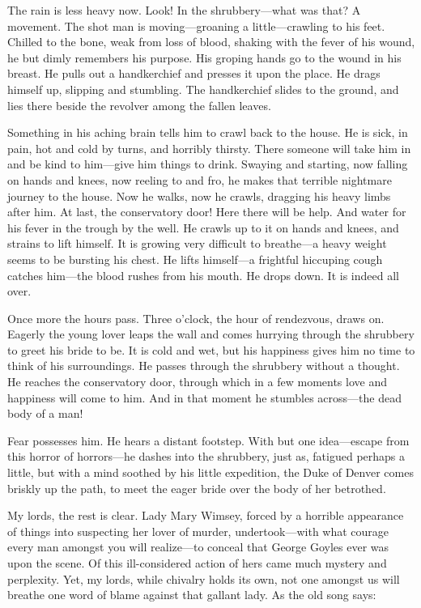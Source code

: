 \begin{dialogue}
The rain is less heavy now. Look! In the shrubbery—what was that? A movement. The shot man is moving—groaning a little—crawling to his feet. Chilled to the bone, weak from loss of blood, shaking with the fever of his wound, he but dimly remembers his purpose. His groping hands go to the wound in his breast. He pulls out a handkerchief and presses it upon the place. He drags himself up, slipping and stumbling. The handkerchief slides to the ground, and lies there beside the revolver among the fallen leaves.

\smallskip

Something in his aching brain tells him to crawl back to the house. He is sick, in pain, hot and cold by turns, and horribly thirsty. There someone will take him in and be kind to him—give him things to drink. Swaying and starting, now falling on hands and knees, now reeling to and fro, he makes that terrible nightmare journey to the house. Now he walks, now he crawls, dragging his heavy limbs after him. At last, the conservatory door! Here there will be help. And water for his fever in the trough by the well. He crawls up to it on hands and knees, and strains to lift himself. It is growing very difficult to breathe—a heavy weight seems to be bursting his chest. He lifts himself—a frightful hiccuping cough catches him—the blood rushes from his mouth. He drops down. It is indeed all over.

\smallskip

Once more the hours pass. Three o'clock, the hour of rendezvous, draws on. Eagerly the young lover leaps the wall and comes hurrying through the shrubbery to greet his bride to be. It is cold and wet, but his happiness gives him no time to think of his surroundings. He passes through the shrubbery without a thought. He reaches the conservatory door, through which in a few moments love and happiness will come to him. And in that moment he stumbles across—the dead body of a man!

\smallskip

Fear possesses him. He hears a distant footstep. With but one idea—escape from this horror of horrors—he dashes into the shrubbery, just as, fatigued perhaps a little, but with a mind soothed by his little expedition, the Duke of Denver comes briskly up the path, to meet the eager bride over the body of her betrothed.

\smallskip

My lords, the rest is clear. Lady Mary Wimsey, forced by a horrible appearance of things into suspecting her lover of murder, undertook—with what courage every man amongst you will realize—to conceal that George Goyles ever was upon the scene. Of this ill-considered action of hers came much mystery and perplexity. Yet, my lords, while chivalry holds its own, not one amongst us will breathe one word of blame against that gallant lady. As the old song says:


\end{dialogue}
